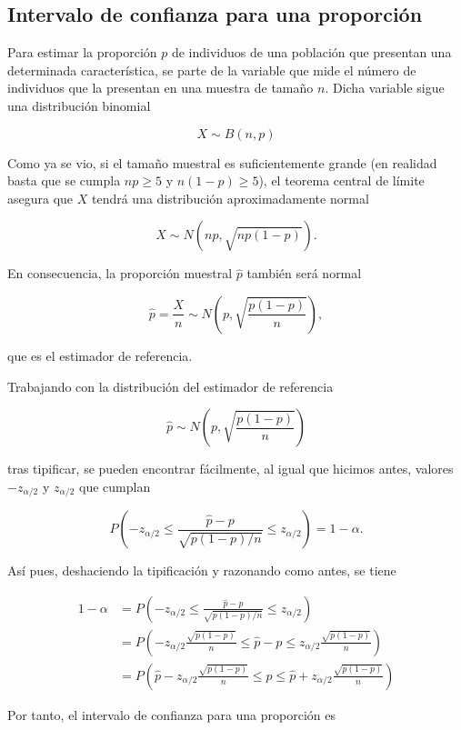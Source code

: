 \documentclass[
  a4paper,
]{scrreport}
\theoremstyle{plain}
\theoremstyle{definition}
\theoremstyle{definition}
\theoremstyle{remark}
\begin{document}
\hypertarget{intervalo-de-confianza-para-una-proporciuxf3n}{%
\subsection{Intervalo de confianza para una
proporción}\label{intervalo-de-confianza-para-una-proporciuxf3n}}

Para estimar la proporción \(p\) de individuos de una población que
presentan una determinada característica, se parte de la variable que
mide el número de individuos que la presentan en una muestra de tamaño
\(n\). Dicha variable sigue una distribución binomial

\[
X\sim B(n,p)
\]

Como ya se vio, si el tamaño muestral es suficientemente grande (en
realidad basta que se cumpla \(np\geq 5\) y \(n(1-p)\geq 5\)), el
teorema central de límite asegura que \(X\) tendrá una distribución
aproximadamente normal

\[
X\sim N(np,\sqrt{np(1-p)}).
\]

En consecuencia, la proporción muestral \(\hat p\) también será normal

\[
\hat{p}=\frac{X}{n} \sim N\left(p,\sqrt{\frac{p(1-p)}{n}}\right),
\]

que es el estimador de referencia.

Trabajando con la distribución del estimador de referencia

\[
\hat p\sim N\left(p,\sqrt{\frac{p(1-p)}{n}}\right)
\]

tras tipificar, se pueden encontrar fácilmente, al igual que hicimos
antes, valores \(-z_{\alpha/2}\) y \(z_{\alpha/2}\) que cumplan

\[
P\left(-z_{\alpha/2}\leq \frac{\hat p-p}{\sqrt{p(1-p)/n}}\leq z_{\alpha/2} \right) = 1-\alpha.
\]

Así pues, deshaciendo la tipificación y razonando como antes, se tiene

\begin{align*}
1-\alpha 
&= P\left(-z_{\alpha/2}\leq \frac{\hat p-p}{\sqrt{p(1-p)/n}}\leq z_{\alpha/2} \right) \\
&= P\left(-z_{\alpha/2}\frac{\sqrt{p(1-p)}}{n}\leq \hat p-p\leq z_{\alpha/2}\frac{\sqrt{p(1-p)}}{n} \right) \\
&= P\left(\hat{p}-z_{\alpha/2}\frac{\sqrt{p(1-p)}}{n}\leq p\leq \hat{p}+z_{\alpha/2}\frac{\sqrt{p(1-p)}}{n} \right)
\end{align*}

Por tanto, el intervalo de confianza para una proporción es
\end{document}
